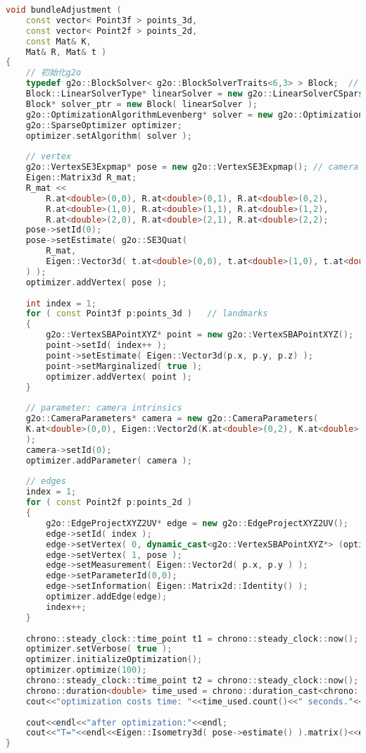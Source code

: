 \begin{lstlisting}[language=c++,caption=slambook/ch7/pose_estimation_3d2d.cpp（片段）]
void bundleAdjustment ( 
	const vector< Point3f > points_3d, 
	const vector< Point2f > points_2d, 
	const Mat& K, 
	Mat& R, Mat& t )
{
	// 初始化g2o
	typedef g2o::BlockSolver< g2o::BlockSolverTraits<6,3> > Block;  // pose 维度为 6, landmark 维度为 3
	Block::LinearSolverType* linearSolver = new g2o::LinearSolverCSparse<Block::PoseMatrixType>(); 
	Block* solver_ptr = new Block( linearSolver );      
	g2o::OptimizationAlgorithmLevenberg* solver = new g2o::OptimizationAlgorithmLevenberg( solver_ptr );
	g2o::SparseOptimizer optimizer;
	optimizer.setAlgorithm( solver );
	
	// vertex 
	g2o::VertexSE3Expmap* pose = new g2o::VertexSE3Expmap(); // camera pose
	Eigen::Matrix3d R_mat;
	R_mat << 
		R.at<double>(0,0), R.at<double>(0,1), R.at<double>(0,2),
		R.at<double>(1,0), R.at<double>(1,1), R.at<double>(1,2),
		R.at<double>(2,0), R.at<double>(2,1), R.at<double>(2,2);
	pose->setId(0);
	pose->setEstimate( g2o::SE3Quat( 
		R_mat, 
		Eigen::Vector3d( t.at<double>(0,0), t.at<double>(1,0), t.at<double>(2,0)) 
	) );
	optimizer.addVertex( pose );
	
	int index = 1;
	for ( const Point3f p:points_3d )   // landmarks
	{
		g2o::VertexSBAPointXYZ* point = new g2o::VertexSBAPointXYZ();
		point->setId( index++ );
		point->setEstimate( Eigen::Vector3d(p.x, p.y, p.z) );
		point->setMarginalized( true );
		optimizer.addVertex( point );
	}
	
	// parameter: camera intrinsics 
	g2o::CameraParameters* camera = new g2o::CameraParameters( 
	K.at<double>(0,0), Eigen::Vector2d(K.at<double>(0,2), K.at<double>(1,2)), 0 
	);
	camera->setId(0);
	optimizer.addParameter( camera );
	
	// edges 
	index = 1;
	for ( const Point2f p:points_2d )
	{
		g2o::EdgeProjectXYZ2UV* edge = new g2o::EdgeProjectXYZ2UV();
		edge->setId( index );
		edge->setVertex( 0, dynamic_cast<g2o::VertexSBAPointXYZ*> (optimizer.vertex(index)) );
		edge->setVertex( 1, pose );
		edge->setMeasurement( Eigen::Vector2d( p.x, p.y ) );
		edge->setParameterId(0,0);
		edge->setInformation( Eigen::Matrix2d::Identity() );
		optimizer.addEdge(edge);
		index++;
	}
	
	chrono::steady_clock::time_point t1 = chrono::steady_clock::now();
	optimizer.setVerbose( true );
	optimizer.initializeOptimization();
	optimizer.optimize(100);
	chrono::steady_clock::time_point t2 = chrono::steady_clock::now();
	chrono::duration<double> time_used = chrono::duration_cast<chrono::duration<double>>(t2-t1);
	cout<<"optimization costs time: "<<time_used.count()<<" seconds."<<endl;
	
	cout<<endl<<"after optimization:"<<endl;
	cout<<"T="<<endl<<Eigen::Isometry3d( pose->estimate() ).matrix()<<endl;
}
\end{lstlisting}

